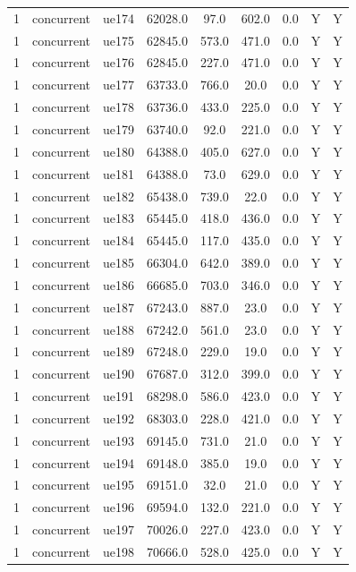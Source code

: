 \begin{table}[ht]
\begin{tabular}{|c|c|c|c|c|c|c|c|c|}
1 & concurrent & ue174 & 62028.0 & 97.0 & 602.0 & 0.0 & Y & Y \\
1 & concurrent & ue175 & 62845.0 & 573.0 & 471.0 & 0.0 & Y & Y \\
1 & concurrent & ue176 & 62845.0 & 227.0 & 471.0 & 0.0 & Y & Y \\
1 & concurrent & ue177 & 63733.0 & 766.0 & 20.0 & 0.0 & Y & Y \\
1 & concurrent & ue178 & 63736.0 & 433.0 & 225.0 & 0.0 & Y & Y \\
1 & concurrent & ue179 & 63740.0 & 92.0 & 221.0 & 0.0 & Y & Y \\
1 & concurrent & ue180 & 64388.0 & 405.0 & 627.0 & 0.0 & Y & Y \\
1 & concurrent & ue181 & 64388.0 & 73.0 & 629.0 & 0.0 & Y & Y \\
1 & concurrent & ue182 & 65438.0 & 739.0 & 22.0 & 0.0 & Y & Y \\
1 & concurrent & ue183 & 65445.0 & 418.0 & 436.0 & 0.0 & Y & Y \\
1 & concurrent & ue184 & 65445.0 & 117.0 & 435.0 & 0.0 & Y & Y \\
1 & concurrent & ue185 & 66304.0 & 642.0 & 389.0 & 0.0 & Y & Y \\
1 & concurrent & ue186 & 66685.0 & 703.0 & 346.0 & 0.0 & Y & Y \\
1 & concurrent & ue187 & 67243.0 & 887.0 & 23.0 & 0.0 & Y & Y \\
1 & concurrent & ue188 & 67242.0 & 561.0 & 23.0 & 0.0 & Y & Y \\
1 & concurrent & ue189 & 67248.0 & 229.0 & 19.0 & 0.0 & Y & Y \\
1 & concurrent & ue190 & 67687.0 & 312.0 & 399.0 & 0.0 & Y & Y \\
1 & concurrent & ue191 & 68298.0 & 586.0 & 423.0 & 0.0 & Y & Y \\
1 & concurrent & ue192 & 68303.0 & 228.0 & 421.0 & 0.0 & Y & Y \\
1 & concurrent & ue193 & 69145.0 & 731.0 & 21.0 & 0.0 & Y & Y \\
1 & concurrent & ue194 & 69148.0 & 385.0 & 19.0 & 0.0 & Y & Y \\
1 & concurrent & ue195 & 69151.0 & 32.0 & 21.0 & 0.0 & Y & Y \\
1 & concurrent & ue196 & 69594.0 & 132.0 & 221.0 & 0.0 & Y & Y \\
1 & concurrent & ue197 & 70026.0 & 227.0 & 423.0 & 0.0 & Y & Y \\
1 & concurrent & ue198 & 70666.0 & 528.0 & 425.0 & 0.0 & Y & Y \\

\end{tabular}
\end{table}
